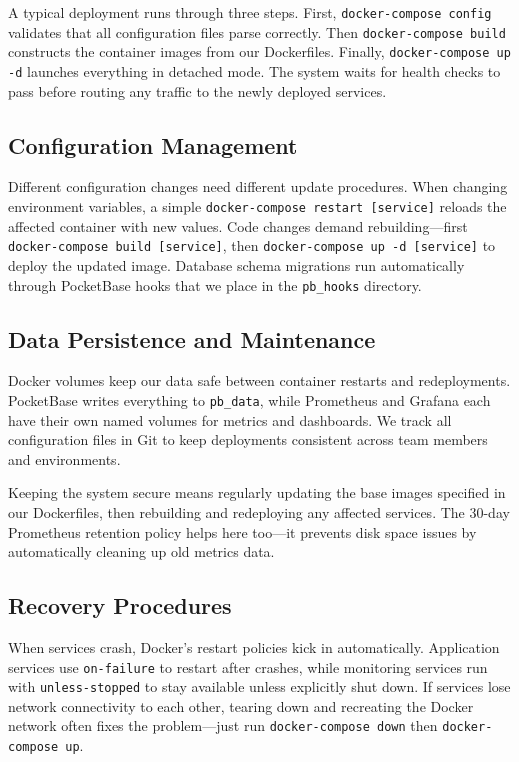 A typical deployment runs through three steps. First, \texttt{docker-compose config} validates that all configuration files parse correctly. Then \texttt{docker-compose build} constructs the container images from our Dockerfiles. Finally, \texttt{docker-compose up -d} launches everything in detached mode. The system waits for health checks to pass before routing any traffic to the newly deployed services.

\subsection{Configuration Management} \label{subsection:configuration_management}

Different configuration changes need different update procedures. When changing environment variables, a simple \texttt{docker-compose restart [service]} reloads the affected container with new values. Code changes demand rebuilding—first \texttt{docker-compose build [service]}, then \texttt{docker-compose up -d [service]} to deploy the updated image. Database schema migrations run automatically through PocketBase hooks that we place in the \texttt{pb\_hooks} directory.

\subsection{Data Persistence and Maintenance} \label{subsection:data_persistence_maintenance}

Docker volumes keep our data safe between container restarts and redeployments. PocketBase writes everything to \texttt{pb\_data}, while Prometheus and Grafana each have their own named volumes for metrics and dashboards. We track all configuration files in Git to keep deployments consistent across team members and environments.

Keeping the system secure means regularly updating the base images specified in our Dockerfiles, then rebuilding and redeploying any affected services. The 30-day Prometheus retention policy helps here too—it prevents disk space issues by automatically cleaning up old metrics data.

\subsection{Recovery Procedures} \label{subsection:recovery_procedures}

When services crash, Docker's restart policies kick in automatically. Application services use \texttt{on-failure} to restart after crashes, while monitoring services run with \texttt{unless-stopped} to stay available unless explicitly shut down. If services lose network connectivity to each other, tearing down and recreating the Docker network often fixes the problem—just run \texttt{docker-compose down} then \texttt{docker-compose up}.

